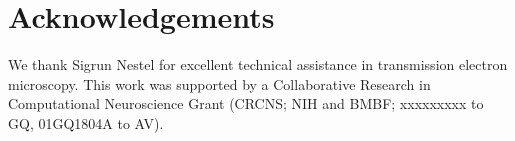 \documentclass[fleqn,12pt]{wlscirep}
\begin{document}
\nocite{*}


\section*{Acknowledgements}

We thank Sigrun Nestel for excellent technical assistance in transmission electron microscopy. This work was supported by a Collaborative Research in Computational Neuroscience Grant (CRCNS; NIH and BMBF; xxxxxxxxx to GQ, 01GQ1804A to AV).
\end{document}
